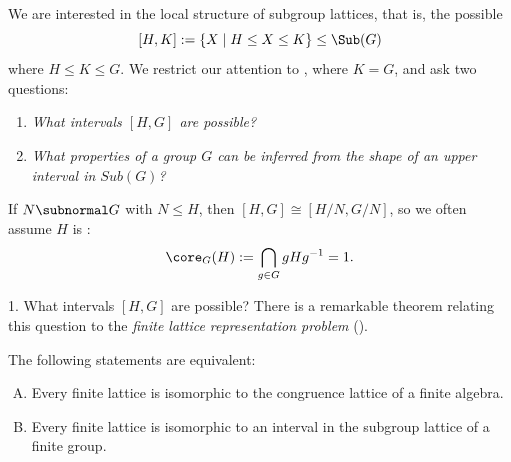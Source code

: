 \begin{frame}[fragile,label=LocalStructure]{}
We are interested in the local structure of subgroup lattices, that is,
the possible 
\[
[H, K] := \{X \mid H \leq X \leq K\} \leq \Sub(G)
\]
where $H \leq K \leq G$. 
\vskip4mm
We restrict our attention to , where $K = G$, and ask two
questions:
\vskip4mm
\begin{enumerate}
\item \emph{What intervals $[H,G]$ are possible?}
\vskip4mm
\item \emph{What properties of a group $G$ can be inferred from the shape of an
  upper interval in $Sub(G)$?}
\end{enumerate}
\end{frame}

\begin{frame}[fragile,label=LocalStructureCoreFree]{}
If $N \subnormal G$
with $N \leq H$, then  $[H, G]\cong [H/N, G/N]$, 
\vskip2mm
so we often assume $H$ is :
\[
\core_G(H) := \bigcap_{g\in G} gHg^{-1} = 1.
\]
\end{frame}

\begin{frame}[fragile,label=LocalStructureNote]{}
\end{frame}

\begin{frame}[fragile,label=LocalStructure]{1. What intervals $[H,G]$ are possible?}
There is a remarkable theorem relating this question to the \emph{finite lattice representation problem} (\FLRP).
\vskip5mm
\begin{theorem}
\label{thm:P5}
The following statements are equivalent:
\begin{enumerate}[(A)]
\item Every finite lattice is isomorphic to
  the congruence lattice of a finite algebra.
\item Every finite lattice is isomorphic to
  an interval in the subgroup lattice of a finite group.
\end{enumerate}
\end{theorem}
\end{frame}

